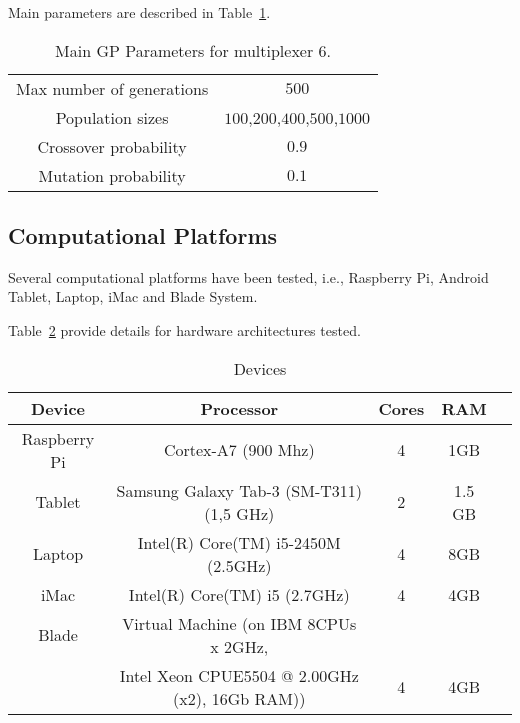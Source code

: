 
Main parameters are described in Table~\ref{Table:par_gp}.  %

\begin{table}
\centering
\caption{Main GP Parameters for multiplexer 6.}
\label{Table:par_gp}
\begin{tabular}{cc}
\hline
Max number of generations & $500$ \\
Population sizes & $100$,$200$,$400$,$500$,$1000$ \\
Crossover probability & $0.9$ \\ 
Mutation probability & $0.1$ \\ 
\hline
\end{tabular}
\end{table}


\subsection{Computational Platforms}
\label{compplat}

Several computational platforms have been tested, i.e., Raspberry Pi, Android Tablet, Laptop, iMac and Blade System.

Table~\ref{Table:devices} provide details for hardware architectures tested. 

\begin{table}
\centering
\caption{Devices}
\label{Table:devices}
\begin{tabular}{ccccc} \hline
Device		&	Processor			&	Cores	&	RAM \\ \hline
Raspberry Pi	& Cortex-A7 (900 Mhz)	& 4 			&	1GB \\
Tablet		& Samsung Galaxy Tab-3 (SM-T311) (1,5 GHz)& 2  & 1.5 GB \\
Laptop 		& Intel(R) Core(TM) i5-2450M (2.5GHz)	&	4	&	8GB\\
iMac			& Intel(R) Core(TM) i5  (2.7GHz)	& 4	& 4GB \\
Blade		& Virtual Machine (on IBM 8CPUs x 2GHz, \\
&Intel Xeon CPUE5504 @ 2.00GHz (x2), 16Gb RAM)) & 4 & 4GB \\
\hline
\end{tabular}
\end{table}


